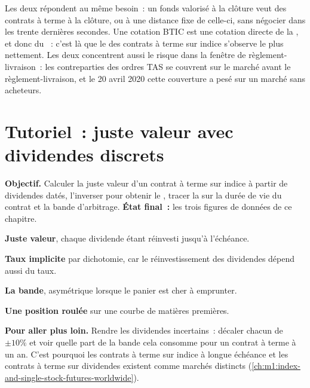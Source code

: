 Les deux répondent au même besoin~: un fonds valorisé à la clôture veut des contrats à terme à la
clôture, ou à une distance fixe de celle-ci, sans négocier dans les trente dernières
secondes. Une cotation BTIC est une cotation directe de la , et donc du ~:
c'est là que le  des contrats à terme sur indice s'observe le plus
nettement. Les deux concentrent aussi le risque dans la fenêtre de règlement-livraison~: les
contreparties des ordres TAS se couvrent sur le marché avant le règlement-livraison, et
le 20 avril 2020 cette couverture a pesé sur un marché sans acheteurs.

\section{Tutoriel~: juste valeur avec dividendes discrets}\label{tut:m1:basis-roll-and-delivery:fv}

\begin{tutorial}
\textbf{Objectif.} Calculer la juste valeur d'un contrat à terme sur indice à partir de dividendes
datés, l'inverser pour obtenir le , tracer la  sur la durée de
vie du contrat et la bande d'arbitrage. \textbf{État final~:} les trois
figures de données de ce chapitre.
\begin{tutsteps}
\item \textbf{Juste valeur}, chaque dividende étant réinvesti jusqu'à l'échéance.
\label{lst:m1:basis-roll-and-delivery:fv}
\item \textbf{Taux implicite} par dichotomie, car le réinvestissement des dividendes
dépend aussi du taux.
\label{lst:m1:basis-roll-and-delivery:implied}
\item \textbf{La bande}, asymétrique lorsque le panier est cher à emprunter.
\label{lst:m1:basis-roll-and-delivery:band}
\item \textbf{Une position roulée} sur une courbe de matières premières.
\label{lst:m1:basis-roll-and-delivery:rolled}
\end{tutsteps}
\textbf{Pour aller plus loin.} Rendre les dividendes incertains~: décaler chacun de
$\pm 10\%$ et voir quelle part de la bande cela consomme pour un contrat à terme à un an.
C'est pourquoi les contrats à terme sur indice à longue échéance et les contrats à terme sur dividendes existent comme
marchés distincts (\cref{ch:m1:index-and-single-stock-futures-worldwide}).
\end{tutorial}

